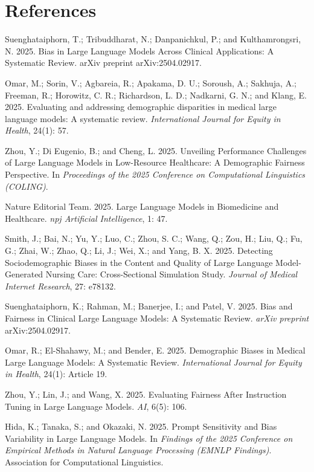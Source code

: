 \documentclass[sigconf]{acmart}
\begin{document}
\newpage
\section{References}

Suenghataiphorn, T.; Tribuddharat, N.; Danpanichkul, P.; and Kulthamrongsri, N. 2025.
Bias in Large Language Models Across Clinical Applications: A Systematic Review.
arXiv preprint arXiv:2504.02917.

Omar, M.; Sorin, V.; Agbareia, R.; Apakama, D. U.; Soroush, A.; Sakhuja, A.;
Freeman, R.; Horowitz, C. R.; Richardson, L. D.; Nadkarni, G. N.; and Klang, E.
2025. Evaluating and addressing demographic disparities in medical large language
models: A systematic review. \textit{International Journal for Equity in Health},
24(1): 57.

Zhou, Y.; Di Eugenio, B.; and Cheng, L. 2025.
Unveiling Performance Challenges of Large Language Models in Low-Resource Healthcare:
A Demographic Fairness Perspective. In \textit{Proceedings of the 2025 Conference on
Computational Linguistics (COLING)}.

Nature Editorial Team. 2025.
Large Language Models in Biomedicine and Healthcare.
\textit{npj Artificial Intelligence}, 1: 47.

Smith, J.; Bai, N.; Yu, Y.; Luo, C.; Zhou, S. C.; Wang, Q.; Zou, H.; Liu, Q.;
Fu, G.; Zhai, W.; Zhao, Q.; Li, J.; Wei, X.; and Yang, B. X. 2025.
Detecting Sociodemographic Biases in the Content and Quality of Large Language
Model-Generated Nursing Care: Cross-Sectional Simulation Study.
\textit{Journal of Medical Internet Research}, 27: e78132.

Suenghataiphorn, K.; Rahman, M.; Banerjee, I.; and Patel, V. 2025.
Bias and Fairness in Clinical Large Language Models: A Systematic Review.
\textit{arXiv preprint} arXiv:2504.02917.

Omar, R.; El-Shahawy, M.; and Bender, E. 2025.
Demographic Biases in Medical Large Language Models: A Systematic Review.
\textit{International Journal for Equity in Health}, 24(1): Article 19.

Zhou, Y.; Lin, J.; and Wang, X. 2025.
Evaluating Fairness After Instruction Tuning in Large Language Models.
\textit{AI}, 6(5): 106.

Hida, K.; Tanaka, S.; and Okazaki, N. 2025.
Prompt Sensitivity and Bias Variability in Large Language Models.
In \textit{Findings of the 2025 Conference on Empirical Methods in Natural Language Processing (EMNLP Findings)}.
Association for Computational Linguistics.
\end{document}
